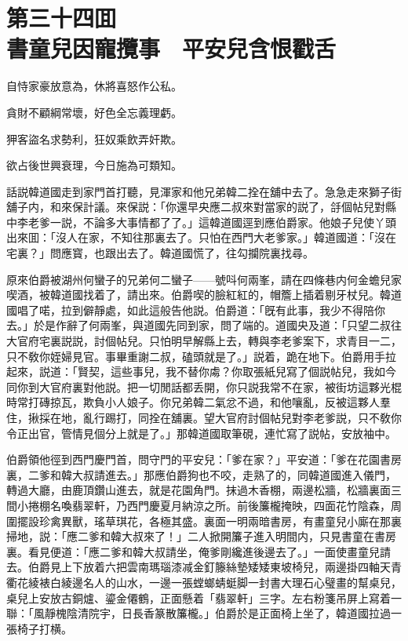 
\chapter*{第三十四囬　\\書童兒因寵攬事　平安兒含恨戳舌}


\begin{myquote}
自恃家豪放意為，休將喜怒作公私。

貪財不顧綱常壞，好色全忘義理虧。

狎客盜名求勢利，狂奴乘飲弄奸欺。

欲占後世興衰理，今日施為可類知。
\end{myquote}

話説韓道國走到家門首打聽，見渾家和他兄弟韓二拴在舖中去了。急急走來獅子街舖子内，和來保計議。來保説：「你還早央應二叔來對當家的説了，㧱個帖兒對縣中李老爹一説，不論多大事情都了了。」這韓道國逕到應伯爵家。他娘子兒使丫頭出來囬：「沒人在家，不知往那裏去了。只怕在西門大老爹家。」韓道國道：「沒在宅裏？」問應寳，也跟出去了。韓道國慌了，往勾攔院裏找尋。

原來伯爵被湖州何蠻子的兄弟何二蠻子——號呌何兩峯，請在四條巷内何金蟾兒家喫酒，被韓道國找着了，請出來。伯爵喫的臉紅紅的，帽簷上插着剔牙杖兒。韓道國唱了喏，拉到僻靜處，如此這般告他説。伯爵道：「旣有此事，我少不得陪你去。」於是作辭了何兩峯，與道國先同到家，問了端的。道國央及道：「只望二叔往大官府宅裏説説，討個帖兒。只怕明早解縣上去，轉與李老爹案下，求青目一二，只不敎你姪婦見官。事畢重謝二叔，磕頭就是了。」説着，跪在地下。伯爵用手拉起來，説道：「賢契，這些事兒，我不替你䖏？你取張紙兒寫了個説帖兒，我如今同你到大官府裏對他説。把一切閒話都丢開，你只説我常不在家，被街坊這夥光棍時常打磚掠瓦，欺負小人娘子。你兄弟韓二氣忿不過，和他嚷亂，反被這夥人羣住，揪採在地，亂行踢打，同拴在舖裏。望大官府討個帖兒對李老爹説，只不敎你令正出官，管情見個分上就是了。」那韓道國取筆硯，連忙寫了説帖，安放袖中。

伯爵領他徑到西門慶門首，問守門的平安兒：「爹在家？」平安道：「爹在花園書房裏，二爹和韓大叔請進去。」那應伯爵狗也不咬，走熟了的，同韓道國進入儀門，轉過大廳，由鹿頂鑽山進去，就是花園角門。抹過木香棚，兩邊松牆，松牆裏面三間小捲棚名喚翡翠軒，乃西門慶夏月納涼之所。前後簾櫳掩映，四面花竹陰森，周圍擺設珍禽異獸，瑤草琪花，各極其盛。裏面一明兩暗書房，有畫童兒小廝在那裏掃地，説：「應二爹和韓大叔來了！」二人掀開簾子進入明間内，只見書童在書房裏。看見便道：「應二爹和韓大叔請坐，俺爹剛纔進後邊去了。」一面使畫童兒請去。伯爵見上下放着六把雲南瑪瑙漆减金釘籐絲墊矮矮東坡椅兒，兩邊掛四軸天青衢花綾裱白綾邊名人的山水，一邊一張螳螂蜻蜓脚一封書大理石心璧畫的幫桌兒，桌兒上安放古銅爐、鎏金僊鶴，正面懸着「翡翠軒」三字。左右粉箋吊屏上寫着一聯：「風靜槐陰清院宇，日長香篆散簾櫳。」伯爵於是正面椅上坐了，韓道國拉過一張椅子打横。

